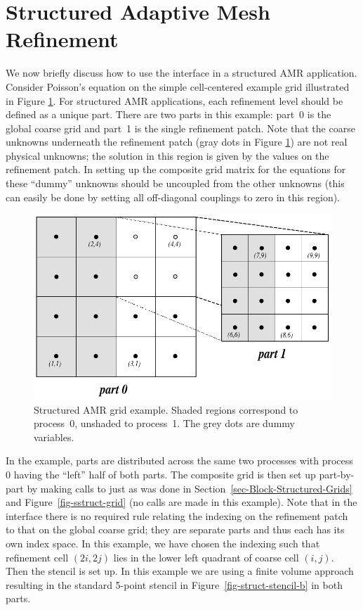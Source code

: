 
\section{Structured Adaptive Mesh Refinement}
\label{sec-Structured-Adaptive-Mesh-Refinement}

We now briefly discuss how to use the  interface in a structured
AMR application.  Consider Poisson's equation on the simple cell-centered
example grid illustrated in Figure \ref{fig-sstruct-samr-grid}.  For structured
AMR applications, each refinement level should be defined as a unique part.
There are two parts in this example: part~0 is the global coarse grid and
part~1 is the single refinement patch.  Note that the coarse unknowns
underneath the refinement patch (gray dots in Figure
\ref{fig-sstruct-samr-grid}) are not real physical unknowns; the solution in
this region is given by the values on the refinement patch.  In setting up the
composite grid matrix \cite{SFMcCormick_1989a} for \hypre{} the equations for
these ``dummy'' unknowns should be uncoupled from the other unknowns (this can
easily be done by setting all off-diagonal couplings to zero in this region).

\begin{figure}
\centering
\includegraphics[width=.7\textwidth]{figSStructExample2a}
\caption{%
Structured AMR grid example. Shaded regions correspond to process~0, unshaded
to process~1.  The grey dots are dummy variables.}
\label{fig-sstruct-samr-grid}
\end{figure}

In the example, parts are distributed across the same two processes with
process 0 having the ``left'' half of both parts.  The composite grid is then
set up part-by-part by making calls to  just as was done
in Section~\ref{sec-Block-Structured-Grids} and Figure~\ref{fig-sstruct-grid}
(no  calls are made in this example).  Note that in the
interface there is no required rule relating the indexing on the refinement
patch to that on the global coarse grid; they are separate parts and thus each
has its own index space.  In this example, we have chosen the indexing such
that refinement cell $(2i,2j)$ lies in the lower left quadrant of coarse cell
$(i,j)$.  Then the stencil is set up.  In this example we are using a finite
volume approach resulting in the standard 5-point stencil in
Figure~\ref{fig-struct-stencil-b} in both parts.

